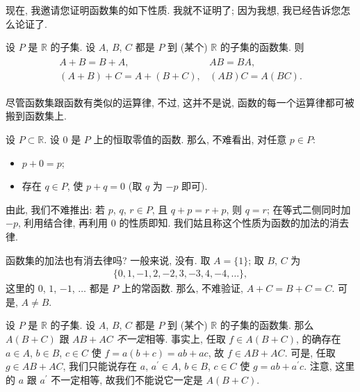 现在, 我邀请您证明函数集的如下性质. 我就不证明了; 因为我想, 我已经告诉您怎么论证了.

\begin{theorem}
    设 $P$ 是 $\mathbb{R}$ 的子集. 设 $A$, $B$, $C$ 都是 $P$ 到 (某个) $\mathbb{R}$ 的子集的函数集. 则
    \begin{align*}
        \begin{array}{ll}
            A + B = B + A,             & AB = BA,       \\
            (A + B) + C = A + (B + C), & (AB)C = A(BC).
        \end{array}
    \end{align*}
\end{theorem}

尽管函数集跟函数有类似的运算律, 不过, 这并不是说, 函数的每一个运算律都可被搬到函数集上.

\begin{example}
    设 $P \subset \mathbb{R}$. 设 $0$ 是 $P$ 上的恒取零值的函数. 那么, 不难看出, 对任意 $p \in P$:
    \begin{itemize}
        \item $p + 0 = p$;
        \item 存在 $q \in P$, 使 $p + q = 0$ (取 $q$ 为 $-p$ 即可).
    \end{itemize}
    由此, 我们不难推出: 若 $p$, $q$, $r \in P$, 且 $q + p = r + p$, 则 $q = r$; 在等式二侧同时加 $-p$, 利用结合律, 再利用 $0$ 的性质即知. 我们姑且称这个性质为函数的加法的消去律.

    函数集的加法也有消去律吗? 一般来说, 没有. 取 $A = \{ 1 \}$; 取 $B$, $C$ 为
    \begin{align*}
        \{ 0, 1, -1, 2, -2, 3, -3, 4, -4, \dots \},
    \end{align*}
    这里的 $0$, $1$, $-1$, $\dots$ 都是 $P$ 上的常函数. 那么, 不难验证, $A + C = B + C = C$. 可是, $A \neq B$.
\end{example}

\begin{example}
    设 $P$ 是 $\mathbb{R}$ 的子集. 设 $A$, $B$, $C$ 都是 $P$ 到 (某个) $\mathbb{R}$ 的子集的函数集. 那么 $A(B + C)$ 跟 $AB + AC$ \emph{不一定}相等. 事实上, 任取 $f \in A(B + C)$, 的确存在 $a \in A$, $b \in B$, $c \in C$ 使 $f = a(b + c) = ab + ac$, 故 $f \in AB + AC$. 可是, 任取 $g \in AB + AC$, 我们只能说存在 $a$, $a^{\prime} \in A$, $b \in B$, $c \in C$ 使 $g = ab + a^{\prime}c$. 注意, 这里的 $a$ 跟 $a^{\prime}$ 不一定相等, 故我们不能说它一定是 $A(B + C)$.
\end{example}

